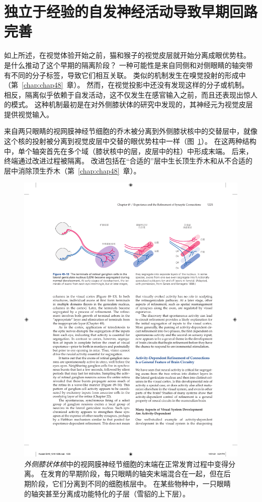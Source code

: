 \section{独立于经验的自发神经活动导致早期回路完善}

如上所述，在视觉体验开始之前，猫和猴子的视觉皮层就开始分离成眼优势柱。
是什么推动了这个早期的隔离阶段？
一种可能性是来自同侧和对侧眼睛的轴突带有不同的分子标签，导致它们相互关联。
类似的机制发生在嗅觉投射的形成中（第~\ref{chap:chap48}~章）。
然而，在视觉投影中还没有发现这样的分子或机制。
相反，隔离似乎依赖于自发活动，这不仅发生在感官输入之前，而且还表现出惊人的模式。
这种机制最初是在对外侧膝状体的研究中发现的，其神经元为视觉皮层提供视觉输入。


来自两只眼睛的视网膜神经节细胞的乔木被分离到外侧膝状核中的交替层中，就像这个核的投射被分离到视觉皮层中交替的眼优势柱中一样（图~\ref{fig:49_13}）。 
在这两种结构中，单个轴突首先在多个域（膝状核中的层，皮层中的柱）中形成末端。
后来，终端通过改进过程被隔离。
改进包括在“合适的”层中生长顶生乔木和从不合适的层中消除顶生乔木（第~\ref{chap:chap48}~章）。


\begin{figure}[htbp]
	\centering
	\includegraphics[width=0.9\linewidth]{chap49/fig_49_13}
	\caption{\textit{外侧膝状体核}中的视网膜神经节细胞的末端在正常发育过程中变得分离。
		在发育的早期阶段，每只眼睛的轴突末端混合在一起，但在后期阶段，它们分离到不同的细胞核层中。
		在某些物种中，一只眼睛的轴突甚至分离成功能特化的子层（雪貂的上下层）\cite{sanes1999formation}。}
	\label{fig:49_13}
\end{figure}


